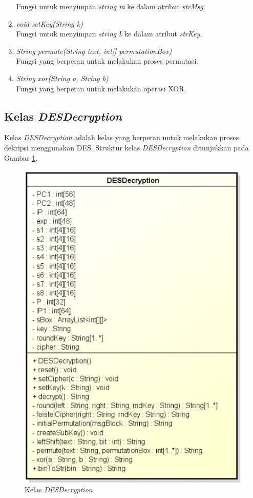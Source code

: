 \begin{enumerate}
	Fungsi untuk menyimpan \textit{string m} ke dalam atribut \textit{strMsg}.
	\item \textit{void setKey(String k)} \\
	Fungsi untuk menyimpan \textit{string k} ke dalam atribut \textit{strKey}.
	\item \textit{String permute(String text, int[] permutationBox)} \\
	Fungsi yang berperan untuk melakukan proses permutasi.
	\item \textit{String xor(String a, String b)} \\
	Fungsi yang berperan untuk melakukan operasi XOR.
\end{enumerate}

\subsection{Kelas \textit{DESDecryption}}

Kelas \textit{DESDecryption} adalah kelas yang berperan untuk melakukan proses dekripsi menggunakan DES. Struktur kelas \textit{DESDecryption} ditunjukkan pada Gambar \ref{fig:classdesdecryption}.

\begin{figure}[H]
	\centering
	\includegraphics[scale=0.6]{Gambar/class_des_decryption}
	\caption{Kelas \textit{DESDecryption}}\label{fig:classdesdecryption}
\end{figure}

